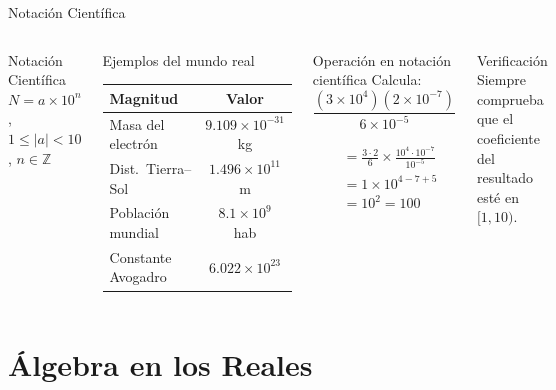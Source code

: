 \documentclass[12pt,aspectratio=169]{beamer}
\begin{document}
\begin{frame}{Notaci\'on Cient\'ifica}
  \begin{columns}[T]
    \begin{cdef}{Notaci\'on Cient\'ifica}
      $N=a\times10^{n}$,\quad $1\le|a|<10$,\; $n\in\mathbb{Z}$
    \end{cdef}
    \vspace{5pt}
    \begin{block}{Ejemplos del mundo real}
      \small\renewcommand{\arraystretch}{1.3}
      \begin{tabular}{lc}
        \toprule Magnitud & Valor\\\midrule
        Masa del electr\'on & $9.109\times10^{-31}$ kg\\
        Dist.\ Tierra--Sol & $1.496\times10^{11}$ m\\
        Poblaci\'on mundial & $8.1\times10^{9}$ hab\\
        Constante Avogadro & $6.022\times10^{23}$\\
        \bottomrule
      \end{tabular}
    \end{block}

    \begin{cejec}{Operaci\'on en notaci\'on cient\'ifica}
      \small Calcula:
      $\dfrac{(3\times10^{4})(2\times10^{-7})}{6\times10^{-5}}$

      \medskip
      \begin{align*}
        &=\frac{3\cdot2}{6}\times\frac{10^{4}\cdot10^{-7}}{10^{-5}}\\[4pt]
        &=1\times10^{4-7+5}\\[4pt]
        &=\boxed{10^{2}=100}
      \end{align*}
    \end{cejec}
    \vspace{4pt}
    \begin{calert}{Verificaci\'on}
      Siempre comprueba que el coeficiente del resultado est\'e en $[1,10)$.
    \end{calert}
  \end{columns}
\end{frame}

\section{\'Algebra en los Reales}
\end{document}
